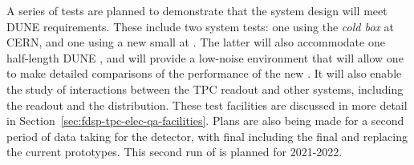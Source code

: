 A series of tests are planned to demonstrate that the  system design will meet DUNE requirements. These include two system tests: one using the  \textit{cold box} at CERN, and one using a new small \lartpc at \fnal. The latter will also accommodate one half-length DUNE , and will provide a low-noise environment that will allow one to make detailed comparisons of the performance of the new . It will also enable the study of interactions between the TPC readout and other systems, including the  readout and the  distribution. These test facilities are discussed in more detail in Section~\ref{sec:fdsp-tpc-elec-qa-facilities}. Plans are also being made for a second period of data taking for the  detector, with final  including the final  and  replacing the current prototypes. This second run of  is planned for 2021-2022.
